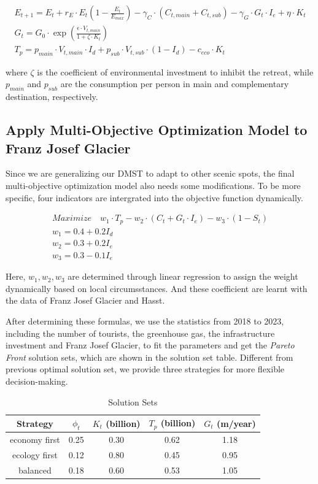 \documentclass{mcmthesis}
\begin{document}
\begin{gather}
  E_{t+1} = E_t + r_E \cdot E_t \left(1 - \frac{E_t}{E_{max}}\right) - \gamma_C \cdot (C_{t,main} + C_{t,sub}) - \gamma_G \cdot G_t \cdot I_e + \eta \cdot K_t \\
  G_t = G_0 \cdot \exp \left(\frac{\epsilon \cdot V_{t,main}}{1+\zeta \cdot K_t}\right) \\
  T_p = p_{main} \cdot V_{t,main} \cdot I_d + p_{sub} \cdot V_{t,sub} \cdot (1 - I_d) - c_{eco} \cdot K_t
\end{gather}

where $\zeta$ is the coefficient of environmental investment to inhibit the retreat, while 
$p_{main}$ and $p_{sub}$ are the consumption per person in main and complementary destination, respectively.

\subsection{Apply Multi-Objective Optimization Model to Franz Josef Glacier}
Since we are generalizing our DMST to adapt to other scenic spots, the final multi-objective optimization model
also needs some modifications. To be more specific, four indicators are intergrated into the objective function dynamically.

\begin{gather}
  Maximize \quad w_1\cdot T_p - w_2 \cdot (C_t + G_t \cdot I_e) - w_3 \cdot (1 - S_t) \\ 
  w_1 = 0.4 + 0.2I_d \\
  w_2 = 0.3 + 0.2I_e \\
  w_3 = 0.3 - 0.1I_e
\end{gather}

Here, $w_1, w_2, w_3$ are determined through linear regression to assign the weight dynamically based on local circumsstances.
And these coefficient are learnt with the data of Franz Josef Glacier and Hasst. 

After determining these formulas, we use the statistics from 2018 to 2023, including the number of tourists, the greenhouse gas, 
the infrastructure investment and Franz Josef Glacier, to fit the parameters and get the \emph{Pareto Front} solution sets, which
are shown in the solution set table. Different from previous optimal solution set, we provide three strategies for more flexible 
decision-making.

\begin{table}[H]
  \caption{Solution Sets}    
  \centering
  \begin{tabular}{ccccc}
    \toprule
    Strategy & $\phi_t$ & $K_t$ (billion) & $T_p$ (billion) & $G_t$ (m/year) \\
    \midrule
    economy first & 0.25 & 0.30 & 0.62 & 1.18 \\
    ecology first & 0.12 & 0.80 & 0.45 & 0.95 \\
    balanced & 0.18 & 0.60 & 0.53 & 1.05 \\
    \bottomrule
  \end{tabular}
\end{table}
\end{document}
